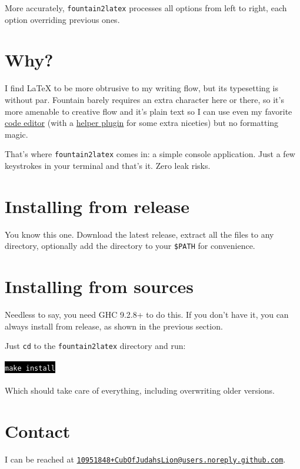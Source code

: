 \documentclass[11pt]{article}
\newcommand{\link}[2]{\textcolor{Blue}{\href{#1}{#2}}}
\newcommand{\cmdline}[1]{    \hspace{0.5in}\colorbox{Black}{\textcolor{White}{\texttt{#1}}}}
\begin{document}
More accurately, \texttt{fountain2latex} processes all options from
left to right, each option overriding previous ones.


\section*{Why?}

I find {\LaTeX} to be more obtrusive to my writing flow, but its
typesetting is without par. Fountain barely requires an extra
character here or there, so it's more amenable to creative flow
and it's plain text so I can use even my favorite
\link{https://www.vim.org/}{code editor} (with
a \link{https://github.com/kblin/vim-fountain}{helper plugin}
for some extra niceties) but no formatting magic.

That's where \texttt{fountain2latex} comes in: a simple console
application. Just a few keystrokes in your terminal and that's it.
Zero leak risks.


\section*{Installing from release}

You know this one. Download the latest release, extract all the files
to any directory, optionally add the directory to your \texttt{\$PATH}
for convenience.


\section*{Installing from sources}

Needless to say, you need \textsf{GHC} 9.2.8+ to do this. If you don't
have it, you can always install from release, as shown in the previous
section.

Just \texttt{cd} to the \texttt{fountain2latex} directory and run:\\
\\
\cmdline{make install}\\
\\
Which should take care of everything, including overwriting older
versions.


\section*{Contact}

I can be reached at \texttt{\link{mailto:10951848+CubOfJudahsLion@users.noreply.github.com}{10951848+CubOfJudahsLion@users.noreply.github.com}}.\\
\end{document}
